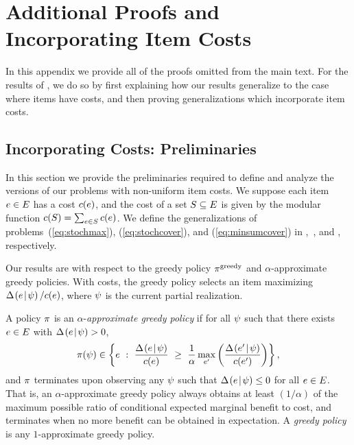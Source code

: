 %
\section{Additional Proofs and Incorporating Item Costs}
 \label{sec:proofs}
%
In this appendix we provide all of the proofs omitted from the main text.
For the results of , 
we do so by first explaining how our results generalize to the case where items have costs, and then proving generalizations which incorporate item costs.

\subsection{Incorporating Costs: Preliminaries} \label{sec:incorporating-costs}  

In this section we provide the preliminaries required to define and analyze the versions of our problems with non-uniform item costs.
We suppose each item $e\in E$ has a 
cost $c(e)$, and the cost of a set
$S\subseteq E$ is given by the modular function $c(S)=\sum_{e\in S}c(e)$.  
We define the generalizations of problems~(\ref{eq:stochmax}), (\ref{eq:stochcover}), and (\ref{eq:minsumcover}) in ,~, and ,  respectively.


Our results are with respect to the greedy policy $\pi^{\text{greedy}}$ and $\alpha$-approximate greedy policies.  With costs, the greedy policy 
selects an item maximizing $\Delta \hspace{-0.3mm} \left( { {e}\! \mid \! {{\color{black}{\ensuremath{\psi}}}} } \right)  /c(e)$, where ${\color{black}{\ensuremath{\psi}}}$ is the current partial realization.

\begin{definition}
A policy $\pi$ is an $\alpha$-\emph{approximate greedy policy} if 
for all ${\color{black}{\ensuremath{\psi}}}$ such that there exists $e \in E$ with $\Delta \hspace{-0.3mm} \left( { {e}\! \mid \! {{\color{black}{\ensuremath{\psi}}}} } \right)   > 0$,
$$\policy(\prlz) \in \set{e \ : \ \frac{\diff{\prlz}{e}}{c(e)} \ \ge
  \ \frac{1}{\alpha} \max_{e'} \paren{\frac{\diff{\prlz}{e'}}{c(e')} }
},$$ 
and $\pi$ terminates upon observing any ${\color{black}{\ensuremath{\psi}}}$ such that $\Delta \hspace{-0.3mm} \left( { {e}\! \mid \! {{\color{black}{\ensuremath{\psi}}}} } \right)   \le 0$ for all $e \in
E$.
That is, an $\alpha$-approximate greedy policy always obtains at least 
$(1/\alpha)$ of the maximum possible ratio of conditional expected
marginal benefit to cost, and terminates when no more benefit can be
obtained in expectation.
A \emph{greedy policy} is any $1$-approximate greedy policy.
\end{definition}


